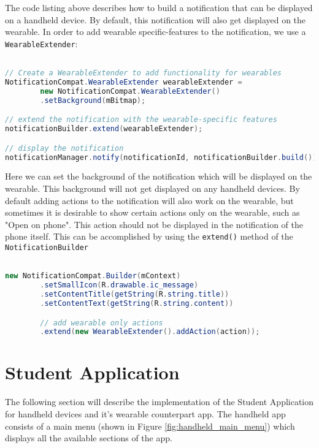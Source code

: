 The code listing above describes how to build a notification that can be
displayed on a handheld device. By default, this notification will also get
displayed on the wearable. In order to add wearable specific-features to the
notification, we use a \texttt{WearableExtender}:

\begin{lstlisting}[language=Java]

// Create a WearableExtender to add functionality for wearables
NotificationCompat.WearableExtender wearableExtender =
        new NotificationCompat.WearableExtender()
        .setBackground(mBitmap);

// extend the notification with the wearable-specific features
notificationBuilder.extend(wearableExtender);

// display the notification
notificationManager.notify(notificationId, notificationBuilder.build());

\end{lstlisting}

Here we can set the background of the notification which will be displayed on
the wearable. This background will not get displayed on any handheld devices.
By default adding actions to the notification will also work on the wearable,
but sometimes it is desirable to show certain actions only on the wearable, such
as "Open on phone". This action should not be displayed in the notification of
the phone itself. This can be accomplished by using the \texttt{extend()} method
of the \texttt{NotificationBuilder}

\begin{lstlisting}[language=Java]

new NotificationCompat.Builder(mContext)
        .setSmallIcon(R.drawable.ic_message)
        .setContentTitle(getString(R.string.title))
        .setContentText(getString(R.string.content))

        // add wearable only actions
        .extend(new WearableExtender().addAction(action));

\end{lstlisting}


\section{Student Application}

The following section will describe the implementation of the Student
Application for handheld devices and it's wearable counterpart app. The handheld
app consists of a main menu (shown in Figure \ref{fig:handheld_main_menu}) which displays all the
available sections of the app.

